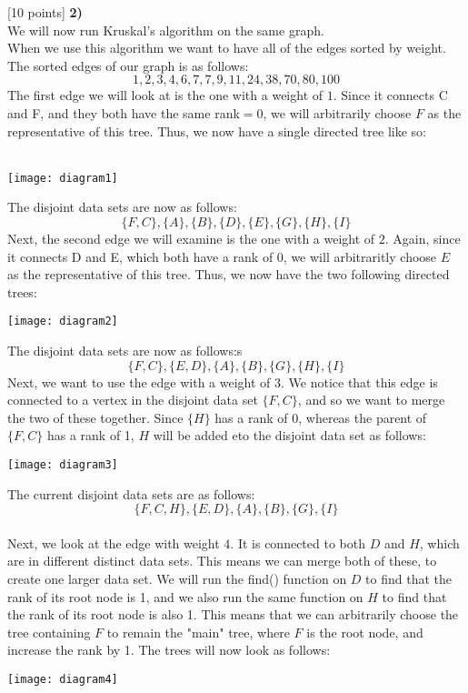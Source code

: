 \documentclass[12pt]{article}
\newcounter{ques}
\newenvironment{question}{\stepcounter{ques}{\noindent\bf Question \arabic{ques}:}}{\vspace{5mm}}
\begin{document}
\begin{question}[10 points]
\textbf{2)}\\
We will now run Kruskal's algorithm on the same graph.\\
When we use this algorithm we want to have all of the edges sorted by weight. The sorted edges of our graph is as follows:
$$1, 2, 3, 4, 6, 7, 7, 9, 11, 24, 38, 70, 80, 100$$
The first edge we will look at is the one with a weight of $1$. Since it connects C and F, and they both have the same rank$=0$, we will arbitrarily choose $F$ as the representative of this tree. Thus, we now have a single directed tree like so:\\\\
\begin{center}
\texttt{[image: diagram1]}
\end{center}
The disjoint data sets are now as follows:
$$\{F,C\},\{A\},\{B\},\{D\},\{E\},\{G\},\{H\},\{I\}$$
Next, the second edge we will examine is the one with a weight of $2$. Again, since it connects D and E, which both have a rank of 0, we will arbitraritly choose $E$ as the representative of this tree. Thus, we now have the two following directed trees:
\begin{center}
\texttt{[image: diagram2]}
\end{center}
The disjoint data sets are now as follows:s
$$\{F,C\},\{E,D\},\{A\},\{B\},\{G\},\{H\},\{I\}$$
Next, we want to use the edge with a weight of $3$. We notice that this edge is connected to a vertex in the disjoint data set $\{F,C\}$, and so we want to merge the two of these together. Since $\{H\}$ has a rank of 0, whereas the parent of $\{F,C\}$ has a rank of 1, $H$ will be added eto the disjoint data set as follows:
\begin{center}
\texttt{[image: diagram3]}
\end{center}
The current disjoint data sets are as follows:
$$\{F,C,H\},\{E,D\},\{A\},\{B\},\{G\},\{I\}$$\\
Next, we look at the edge with weight $4$. It is connected to both $D$ and $H$, which are in different distinct data sets. This means we can merge both of these, to create one larger data set. We will run the find() function on $D$ to find that the rank of its root node is 1, and we also run the same function on $H$ to find that the rank of its root node is also 1. This means that we can arbitrarily choose the tree containing $F$ to remain the "main" tree, where $F$ is the root node, and increase the rank by 1. The trees will now look as follows:
\begin{center}
\texttt{[image: diagram4]}
\end{center}



\end{question}
\end{document}
